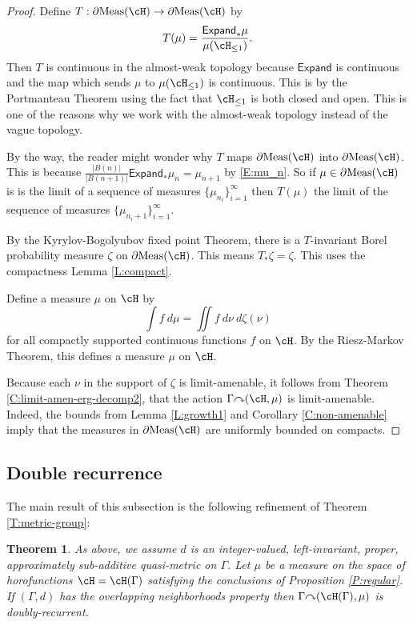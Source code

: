 \documentclass[12pt]{article}
\theoremstyle{plain}
\newtheorem{thm}{Theorem}[section]
\theoremstyle{definition}
\theoremstyle{remark}
\newcommand{\G}{\Gamma}
\newcommand{\Add}{\mathsf{Expand}}
\newcommand\Meas{{\operatorname{Meas}}}
\def\cc{{\curvearrowright}}
\begin{document}
\begin{proof}


Define $T: \partial\Meas(\cH) \to \partial\Meas(\cH)$ by
$$T(\mu) = \frac{\Add_{*}\mu}{\mu(\cH_{\le 1})}.$$
Then $T$ is continuous in the almost-weak topology because $\Add$ is continuous and the map which sends $\mu$ to $\mu(\cH_{\le 1})$ is continuous. This is by the Portmanteau Theorem using the fact that $\cH_{\le 1}$ is both closed and open. This is one of the reasons why we work with the almost-weak topology instead of the vague topology.

By the way, the reader might wonder why $T$ maps $\partial\Meas(\cH)$ into $\partial\Meas(\cH)$. This is because $\frac{|B(n)|}{|B(n+1)|}\Add_*\mu_n = \mu_{n+1}$ by \eqref{E:mu_n}. So if $\mu \in \partial\Meas(\cH)$ is is the limit of a sequence of measures $\{\mu_{n_i}\}_{i=1}^\infty$ then $T(\mu)$ the limit of the sequence of measures $\{\mu_{n_i+1}\}_{i=1}^\infty$.

By the Kyrylov-Bogolyubov fixed point Theorem, there is a $T$-invariant Borel probability measure $\zeta$ on $\partial\Meas(\cH)$. This means $T_*\zeta=\zeta$. This uses the compactness Lemma \ref{L:compact}.

Define a measure $\mu$ on $\cH$ by
$$\int f~d\mu = \iint f~d\nu ~d\zeta(\nu)$$
for all compactly supported continuous functions $f$ on $\cH$. By the Riesz-Markov Theorem, this defines a measure $\mu$ on $\cH$.  

Because each $\nu$ in the support of $\zeta$ is limit-amenable, it follows from Theorem \ref{C:limit-amen-erg-decomp2}, that the action $\G \cc (\cH,\mu)$ is limit-amenable. Indeed, the bounds from Lemma \ref{L:growth1} and Corollary \ref{C:non-amenable} imply that the measures in $\partial \Meas(\cH)$ are uniformly bounded on compacts.
\end{proof}

\subsection{Double recurrence}\label{S:metric-DR}

The main result of this subsection is the following refinement of Theorem \ref{T:metric-group}:

\begin{thm}\label{T:metric-group2}
As above, we assume $d$ is an integer-valued, left-invariant, proper, approximately sub-additive quasi-metric on $\G$. Let $\mu$ be a measure on the space of horofunctions $\cH=\cH(\Gamma)$ satisfying the conclusions of Proposition \ref{P:regular}.  If $(\G,d)$ has the overlapping neighborhoods property then $\G \cc (\cH(\G),\mu)$ is doubly-recurrent.
\end{thm}
\end{document}
